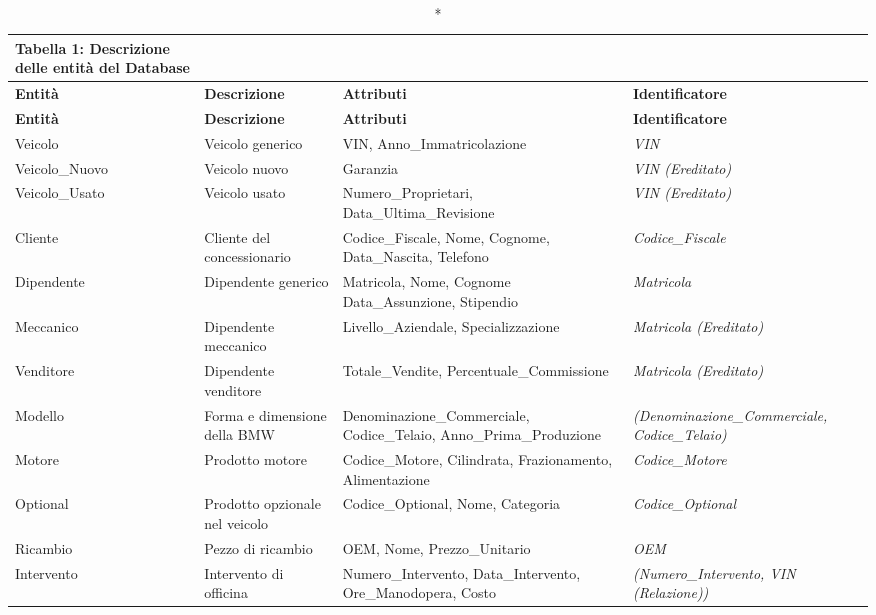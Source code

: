 \vspace{1cm}

\renewcommand{\arraystretch}{1.8}
\begin{longtable}{|p{3cm}|p{3.5cm}|>{\RaggedRight\arraybackslash}p{5cm}|p{3cm}|}

\caption*{\textbf{Tabella 1:} Descrizione delle entità del Database}
\\

\hline
\textbf{Entità} & \textbf{Descrizione} & \textbf{Attributi} & \textbf{Identificatore} \\
\hline
\endfirsthead

\hline
\textbf{Entità} & \textbf{Descrizione} & \textbf{Attributi} & \textbf{Identificatore} \\
\hline
\endhead

Veicolo &
Veicolo generico &
VIN, Anno\_Immatricolazione &
\textit{VIN} \\
\hline

Veicolo\_Nuovo &
Veicolo nuovo &
Garanzia &
\textit{VIN (Ereditato)} \\
\hline

Veicolo\_Usato &
Veicolo usato &
Numero\_Proprietari, Data\_Ultima\_Revisione &
\textit{VIN (Ereditato)} \\
\hline

Cliente &
Cliente del concessionario &
Codice\_Fiscale, Nome, Cognome, Data\_Nascita, Telefono &
\textit{Codice\_Fiscale} \\
\hline

Dipendente &
Dipendente generico &
Matricola, Nome, Cognome Data\_Assunzione, Stipendio &
\textit{Matricola} \\
\hline

Meccanico &
Dipendente meccanico &
Livello\_Aziendale, Specializzazione &
\textit{Matricola (Ereditato)} \\
\hline

Venditore &
Dipendente venditore &
Totale\_Vendite, Percentuale\_Commissione &
\textit{Matricola (Ereditato)} \\
\hline

Modello &
Forma e dimensione della BMW &
Denominazione\_Commerciale, Codice\_Telaio, Anno\_Prima\_Produzione &
\textit{(Denominazione\_\allowbreak Commerciale, Codice\_Telaio)} \\
\hline

Motore &
Prodotto motore &
Codice\_Motore, \newline Cilindrata, Frazionamento, Alimentazione &
\textit{Codice\_Motore} \\
\hline

Optional &
Prodotto opzionale nel veicolo &
Codice\_Optional, Nome, Categoria &
\textit{Codice\_Optional} \\
\hline

Ricambio &
Pezzo di ricambio &
OEM, Nome, Prezzo\_Unitario &
\textit{OEM} \\
\hline

Intervento &
Intervento di officina &
Numero\_Intervento, Data\_\allowbreak Intervento, Ore\_Manodopera, Costo &
\textit{(Numero\_Intervento, VIN (Relazione))} \\
\hline

\end{longtable}

